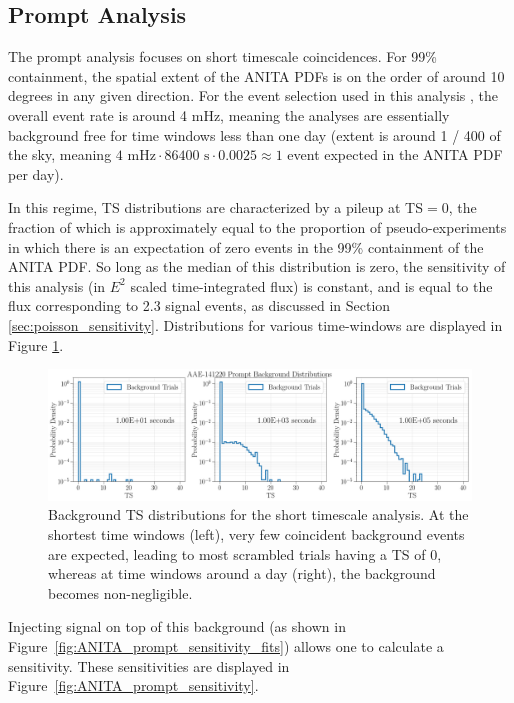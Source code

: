 \subsection{Prompt Analysis}
\label{ref:subsec:ANITA_prompt}
The prompt analysis focuses on short timescale coincidences. For 99\% containment, the spatial extent of the ANITA PDFs is on the order of around 10 degrees in any given direction. For the event selection used in this analysis \cite{Carver:2019jcd}, the overall event rate is around 4 mHz, meaning the analyses are essentially background free for time windows less than one day (extent is around 1 / 400 of the sky, meaning $4 \mbox{ mHz} \cdot 86400 \mbox{ s} \cdot 0.0025 \approx 1$ event expected in the ANITA PDF per day).

In this regime, TS distributions are characterized by a pileup at TS$=0$, the fraction of which is approximately equal to the proportion of pseudo-experiments in which there is an expectation of zero events in the 99\% containment of the ANITA PDF. So long as the median of this distribution is zero, the sensitivity of this analysis (in $E^2$ scaled time-integrated flux) is constant, and is equal to the flux corresponding to 2.3 signal events, as discussed in Section \ref{sec:poisson_sensitivity}. Distributions for various time-windows are displayed in Figure \ref{fig:ANITA_prompt_bgts}.

\begin{figure}
    \centering
    \includegraphics[width=.95\linewidth]{figures/ANITA/Prompt/AAE-141220_background_ts_distributions.png}
    \caption[ANITA Prompt backgroun TS distributions]{Background TS distributions for the short timescale analysis. At the shortest time windows (left), very few coincident background events are expected, leading to most scrambled trials having a TS of 0, whereas at time windows around a day (right), the background becomes non-negligible.}
    \label{fig:ANITA_prompt_bgts}
\end{figure}

Injecting signal on top of this background (as shown in Figure~\ref{fig:ANITA_prompt_sensitivity_fits}) allows one to calculate a sensitivity. These sensitivities are displayed in Figure~\ref{fig:ANITA_prompt_sensitivity}.

